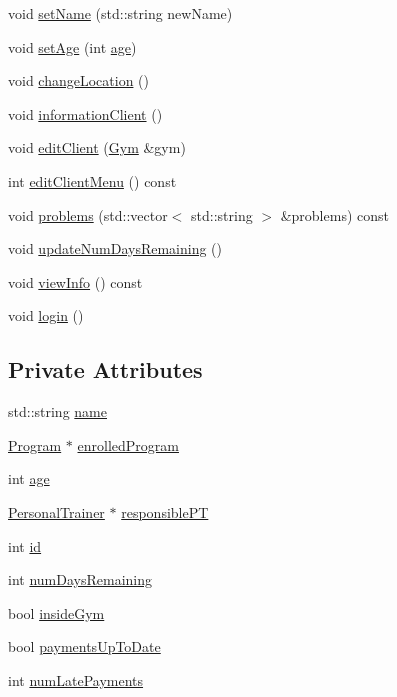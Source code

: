 \begin{DoxyCompactItemize}
\item 
void \hyperlink{classClient_a92f882c9a5d2afc428ae42812a197a0c}{set\+Name} (std\+::string new\+Name)
\item 
void \hyperlink{classClient_afbb916bd058495f4d54ab5d567a12933}{set\+Age} (int \hyperlink{classClient_a847a510d64446c994f541ef31fc85dfd}{age})
\item 
void \hyperlink{classClient_a227a384a1162fb48213c0676eaf727ed}{change\+Location} ()
\item 
void \hyperlink{classClient_a62469723bcb29e436f77671f8ec4b387}{information\+Client} ()
\item 
void \hyperlink{classClient_abfb69e6295d6b9d9cda15307b56b4a88}{edit\+Client} (\hyperlink{classGym}{Gym} \&gym)
\item 
int \hyperlink{classClient_a0d53b7a89786a889e58bb0747db0fb50}{edit\+Client\+Menu} () const 
\item 
void \hyperlink{classClient_ac58c1db7cd66a7f46fdbcf092b7d7ce4}{problems} (std\+::vector$<$ std\+::string $>$ \&problems) const 
\item 
void \hyperlink{classClient_a8265f9376eb389ad39d3773d241df027}{update\+Num\+Days\+Remaining} ()
\item 
void \hyperlink{classClient_acd85c53a285705923032e99a98631320}{view\+Info} () const 
\item 
void \hyperlink{classClient_a923c7418e192b80599e3a36565ac4649}{login} ()
\end{DoxyCompactItemize}
\subsection*{Private Attributes}
\begin{DoxyCompactItemize}
\item 
std\+::string \hyperlink{classClient_a989817815d95a2a9d22826c310613456}{name}
\item 
\hyperlink{classProgram}{Program} $\ast$ \hyperlink{classClient_a0756fdfb15e4147754bfb12924d131ed}{enrolled\+Program}
\item 
int \hyperlink{classClient_a847a510d64446c994f541ef31fc85dfd}{age}
\item 
\hyperlink{classPersonalTrainer}{Personal\+Trainer} $\ast$ \hyperlink{classClient_a24e7555c9620eb1161a403982ffcb8c7}{responsible\+PT}
\item 
int \hyperlink{classClient_ab79ad95264939f089a2f0b8e0ca62d37}{id}
\item 
int \hyperlink{classClient_a28e52b4c9fd1c169c7abccdc8e41fa55}{num\+Days\+Remaining}
\item 
bool \hyperlink{classClient_acdff9ca6cf9b633b5c0e351afb10126e}{inside\+Gym}
\item 
bool \hyperlink{classClient_a3ddae3a0eb169cce62a3543f7fdd170e}{payments\+Up\+To\+Date}
\item 
int \hyperlink{classClient_aec7bf9db56a65daa90e29bf210885d97}{num\+Late\+Payments}
\end{DoxyCompactItemize}
